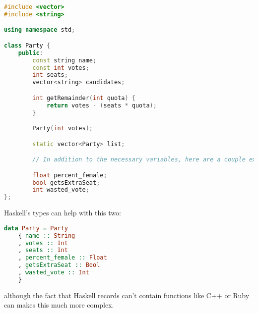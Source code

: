 \documentclass{article}
\begin{document}
    \begin{lstlisting}[language=C++]
#include <vector>
#include <string>

using namespace std;

class Party {
    public:
        const string name;
        const int votes;
        int seats;
        vector<string> candidates;

        int getRemainder(int quota) {
            return votes - (seats * quota);
        }

        Party(int votes);

        static vector<Party> list;

        // In addition to the necessary variables, here are a couple extra

        float percent_female;
        bool getsExtraSeat;
        int wasted_vote;
};
    \end{lstlisting}

    Haskell's types can help with this two:

    \begin{lstlisting}[language=Haskell]
data Party = Party
    { name :: String
    , votes :: Int
    , seats :: Int
    , percent_female :: Float
    , getsExtraSeat :: Bool
    , wasted_vote :: Int
    }
    \end{lstlisting}

    although the fact that Haskell records can't contain functions like C++ or Ruby can makes this much more complex. 
\end{document}
